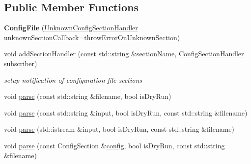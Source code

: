 \subsection*{Public Member Functions}
\begin{DoxyCompactItemize}
\item 
{\bfseries Config\+File} (\hyperlink{namespacenfd_a5b37a7c021db2aa61fe8780e1b42c02c}{Unknown\+Config\+Section\+Handler} unknown\+Section\+Callback=throw\+Error\+On\+Unknown\+Section)\hypertarget{classnfd_1_1ConfigFile_a53054cecce77483b28c5ff12f8de87fe}{}\label{classnfd_1_1ConfigFile_a53054cecce77483b28c5ff12f8de87fe}

\item 
void \hyperlink{classnfd_1_1ConfigFile_abceef4dbc4745b3fdb971454e59745a0}{add\+Section\+Handler} (const std\+::string \&section\+Name, \hyperlink{namespacenfd_ae90d10c3eaad87418aa1dc2ad251aec5}{Config\+Section\+Handler} subscriber)\hypertarget{classnfd_1_1ConfigFile_abceef4dbc4745b3fdb971454e59745a0}{}\label{classnfd_1_1ConfigFile_abceef4dbc4745b3fdb971454e59745a0}

\begin{DoxyCompactList}\small\item\em setup notification of configuration file sections \end{DoxyCompactList}\item 
void \hyperlink{classnfd_1_1ConfigFile_a45691945cab4e710fbbd31d720981ead}{parse} (const std\+::string \&filename, bool is\+Dry\+Run)
\item 
void \hyperlink{classnfd_1_1ConfigFile_a8889a64acd3a073778448436e3aaaf49}{parse} (const std\+::string \&input, bool is\+Dry\+Run, const std\+::string \&filename)
\item 
void \hyperlink{classnfd_1_1ConfigFile_a5d7eae035df50308f6328a8de0085686}{parse} (std\+::istream \&input, bool is\+Dry\+Run, const std\+::string \&filename)
\item 
void \hyperlink{classnfd_1_1ConfigFile_a69749f921026e615181c7df3933f490b}{parse} (const Config\+Section \&\hyperlink{classconfig}{config}, bool is\+Dry\+Run, const std\+::string \&filename)
\end{DoxyCompactItemize}
